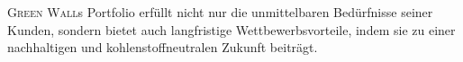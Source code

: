 \textsc{Green Wall}s Portfolio erfüllt nicht nur die unmittelbaren Bedürfnisse seiner Kunden, sondern bietet auch langfristige Wettbewerbsvorteile, indem sie zu einer nachhaltigen und kohlenstoffneutralen Zukunft beiträgt.

%     
